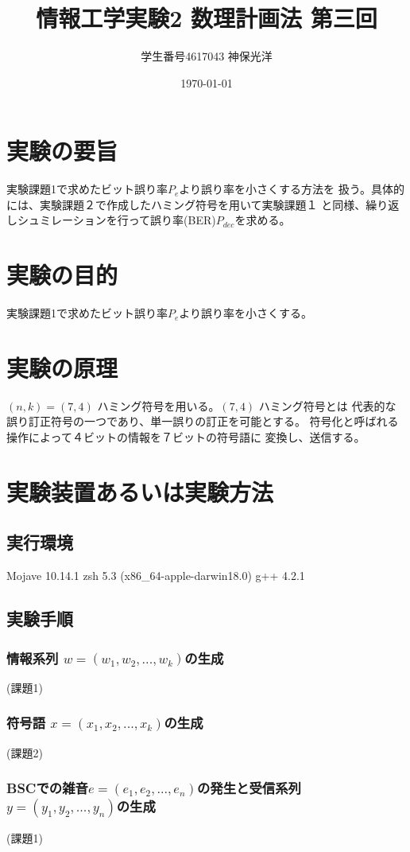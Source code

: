 \documentclass{jsarticle}
\title{情報工学実験2 数理計画法 第三回}
\author{学生番号4617043 神保光洋}
\date{\today}
\begin{document}
\maketitle

\section{実験の要旨}
実験課題1で求めたビット誤り率$P_e$より誤り率を小さくする方法を
扱う。具体的には、実験課題２で作成したハミング符号を用いて実験課題１
と同様、繰り返しシュミレーションを行って誤り率(BER)$P_{dec}$を求める。

\section{実験の目的}
実験課題1で求めたビット誤り率$P_e$より誤り率を小さくする。

\section{実験の原理}
$(n, k) = (7, 4)$ ハミング符号を用いる。$(7, 4)$ ハミング符号とは
代表的な誤り訂正符号の一つであり、単一誤りの訂正を可能とする。
符号化と呼ばれる操作によって４ビットの情報を７ビットの符号語に
変換し、送信する。




\section{実験装置あるいは実験方法}
\subsection{実行環境}
Mojave 10.14.1
zsh 5.3 (x86\_64-apple-darwin18.0)
g++ 4.2.1

\subsection{実験手順}
\subsubsection{情報系列 $w = (w_1, w_2, ..., w_k)$の生成}
(課題1)
\subsubsection{符号語 $x = (x_1, x_2, ..., x_k)$の生成}
(課題2)
\subsubsection{BSCでの雑音$e = (e_1, e_2, ..., e_n)$の発生と受信系列$y=(y_1, y_2, ..., y_n)$の生成}
(課題1)
\end{document}
